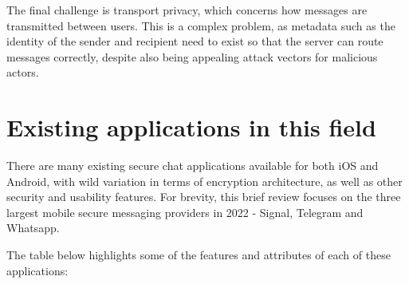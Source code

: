 \documentclass{mproj}
\begin{document}
The final challenge is transport privacy, which concerns how messages are transmitted between users. This is a complex problem, as metadata such as the identity of the sender and recipient need to exist so that the server can route messages correctly, despite also being appealing attack vectors for malicious actors.

\section{Existing applications in this field}
There are many existing secure chat applications available for both iOS and Android, with wild variation in terms of encryption architecture, as well as other security and usability features. For brevity, this brief review focuses on the three largest mobile secure messaging providers in 2022 - Signal, Telegram and Whatsapp.

The table below highlights some of the features and attributes of each of these applications:
\end{document}
